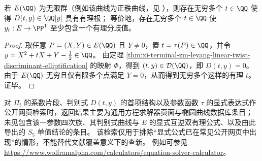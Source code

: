 \begin{corollary}[无穷多个有理参数产生有理分歧值]\label{cor:xi-terminal-zm-leyang-linear-twist-infinitely-many-rational-branch-values}
若 \(E(\QQ)\) 为无限群（例如该曲线为正秩曲线，见 \cite{LMFDBEllipticCurve37a1}），则存在无穷多个 \(t\in\QQ\) 使得 \(D(t,y)\in\QQ[y]\) 具有有理根；
等价地，存在无穷多个 \(t\in\QQ\) 使 \(y_t:E\to\PP^1\) 至少包含一个有理分歧值。
\end{corollary}
\begin{proof}
取任意 \(P=(X,Y)\in E(\QQ)\) 且 \(Y\neq 0\)，置 \(t=\tau(P)\in\QQ\)，并令 \(y=X^2+tX+Y-\tfrac12\in\QQ\)。
由定理 \ref{thm:xi-terminal-zm-leyang-linear-twist-discriminant-elliptification} 的映射 \(\Phi\)，得到 \((t,y)\in\mathcal D(\QQ)\)，即 \(D(t,y)=0\)。
由于 \(E(\QQ)\) 无穷且仅有限多个点满足 \(Y=0\)，从而得到无穷多个这样的有理 \(t\)。
证毕。
\end{proof}

\begin{remark}[公开网页层面的形式同一性检索]\label{rem:xi-terminal-zm-leyang-linear-twist-public-search-formal}
对 \(\Pi_t\) 的系数片段、判别式 \(D(t,y)\) 的首项结构以及参数函数 \(\tau\) 的显式表达式作公开网页检索时，返回结果主要为通用方程求解器页面与椭圆曲线数据库条目；
未见包含该一参数四次族、其判别式曲线与 \(E\) 的显式互逆双有理公式、以及由此导出的 \(S_5\) 单值结论的条目。
该检索仅用于排除“显式公式已在常见公开网页中出现”的情形，不能替代文献覆盖意义下的查新。
例如可参见 \url{https://www.wolframalpha.com/calculators/equation-solver-calculator}。
\end{remark}

